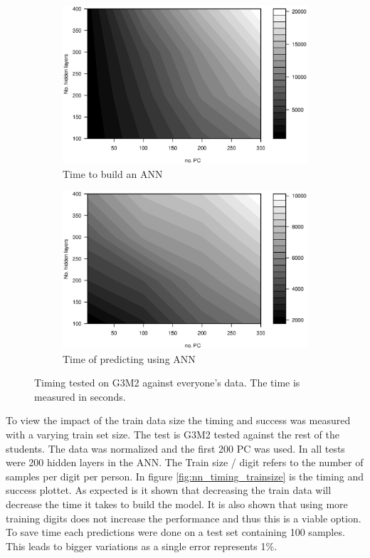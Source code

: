\begin{figure}[h]
    \begin{subfigure}{0.49\textwidth}
    \centering
        \includegraphics[width=\textwidth]{graphics/contour_nn_size_vs_pca_model}
        \caption{Time to build an ANN}
        \label{fig:contour_nn_size_vs_pca_time_model}
    \end{subfigure}
    \begin{subfigure}{0.49\textwidth}
        \includegraphics[width=\textwidth]{graphics/contour_nn_size_vs_pca_predict}
        \caption{Time of predicting using ANN}
        \label{fig:contour_nn_size_vs_pca_time_predict}
    \end{subfigure}
    \caption{Timing tested on G3M2 against everyone's data. The time is measured in seconds.}
    \label{fig:contour_nn_both}
\end{figure}

To view the impact of the train data size the timing and success was measured with a varying train set size.
The test is G3M2 tested against the rest of the students.
The data was normalized and the first 200 PC was used.
In all tests were 200 hidden layers in the ANN.
The Train size / digit refers to the number of samples per digit per person.
In figure \ref{fig:nn_timing_trainsize} is the timing and success plottet.
As expected is it shown that decreasing the train data will decrease the time it takes to build the model.
It is also shown that using more training digits does not increase the performance and thus this is a viable option.
To save time each predictions were done on a test set containing 100 samples. This leads to bigger variations as a single error represents 1\%.

